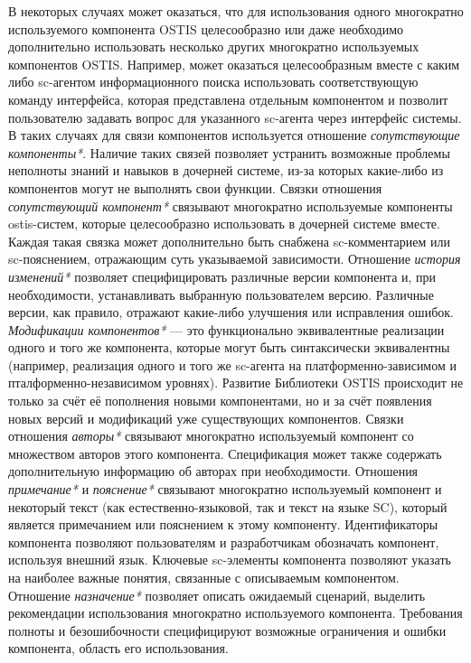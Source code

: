В некоторых случаях может оказаться, что для использования одного многократно используемого компонента OSTIS целесообразно или даже необходимо дополнительно использовать несколько других многократно используемых компонентов OSTIS. Например, может оказаться целесообразным вместе с каким либо sc-агентом информационного поиска использовать соответствующую команду интерфейса, которая представлена отдельным компонентом и позволит пользователю задавать вопрос для указанного sc-агента через интерфейс системы. В таких случаях для связи компонентов используется отношение \textit{сопутствующие компоненты*}. Наличие таких связей позволяет устранить возможные проблемы неполноты знаний и навыков в дочерней системе, из-за которых какие-либо из компонентов могут не выполнять свои функции. Связки отношения \textit{сопутствующий компонент*} связывают многократно используемые компоненты ostis-систем, которые целесообразно использовать в дочерней системе вместе. Каждая такая связка может дополнительно быть снабжена sc-комментарием или sc-пояснением, отражающим суть указываемой зависимости. Отношение \textit{история изменений*} позволяет специфицировать различные версии компонента и, при необходимости, устанавливать выбранную пользователем версию. Различные версии, как правило, отражают какие-либо улучшения или исправления ошибок. \textit{Модификации компонентов*} --- это функционально эквивалентные реализации одного и того же компонента, которые могут быть синтаксически эквивалентны (например, реализация одного и того же sc-агента на платформенно-зависимом и пталформенно-независимом уровнях). Развитие Библиотеки OSTIS происходит не только за счёт её пополнения новыми компонентами, но и за счёт появления новых версий и модификаций уже существующих компонентов. Связки отношения \textit{авторы*} связывают многократно используемый компонент со множеством авторов этого компонента. Спецификация может также содержать дополнительную информацию об авторах при необходимости. Отношения \textit{примечание*} и \textit{пояснение*} связывают многократно используемый компонент и некоторый текст (как естественно-языковой, так и текст на языке SC), который является примечанием или пояснением к этому компоненту. Идентификаторы компонента позволяют пользователям и разработчикам обозначать компонент, используя внешний язык. Ключевые sc-элементы компонента позволяют указать на наиболее важные понятия, связанные с описываемым компонентом. Отношение \textit{назначение*} позволяет описать ожидаемый сценарий, выделить рекомендации использования многократно используемого компонента. Требования полноты и безошибочности специфицируют возможные ограничения и ошибки компонента, область его использования.

